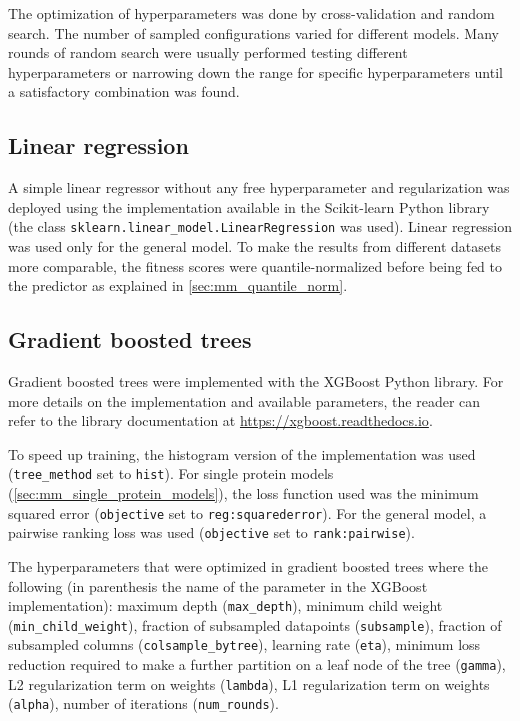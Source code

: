 The optimization of hyperparameters was done by cross-validation and random search.
The number of sampled configurations varied for different models.
Many rounds of random search were usually performed testing different hyperparameters or narrowing down the range for specific hyperparameters until a satisfactory combination was found.

\subsection{Linear regression}
A simple linear regressor without any free hyperparameter and regularization was deployed using the implementation available in the Scikit-learn Python library (the class \texttt{sklearn.linear\_model.LinearRegression} was used).
Linear regression was used only for the general model.
To make the results from different datasets more comparable, the fitness scores were quantile-normalized before being fed to the predictor as explained in \autoref{sec:mm_quantile_norm}.

\subsection{Gradient boosted trees}
Gradient boosted trees were implemented with the XGBoost Python library.
For more details on the implementation and available parameters, the reader can refer to the library documentation at \url{https://xgboost.readthedocs.io}.

To speed up training, the histogram version of the implementation was used (\texttt{tree\_method} set to \texttt{hist}).
For single protein models (\autoref{sec:mm_single_protein_models}), the loss function used was the minimum squared error (\texttt{objective} set to \texttt{reg:squarederror}).
For the general model, a pairwise ranking loss was used (\texttt{objective} set to \texttt{rank:pairwise}).

The hyperparameters that were optimized in gradient boosted trees where the following (in parenthesis the name of the parameter in the XGBoost implementation): maximum depth (\texttt{max\_depth}), minimum child weight (\texttt{min\_child\_weight}), fraction of subsampled datapoints (\texttt{subsample}), fraction of subsampled columns (\texttt{colsample\_bytree}), learning rate (\texttt{eta}), minimum loss reduction required to make a further partition on a leaf node of the tree (\texttt{gamma}), L2 regularization term on weights (\texttt{lambda}), L1 regularization term on weights (\texttt{alpha}), number of iterations (\texttt{num\_rounds}).

